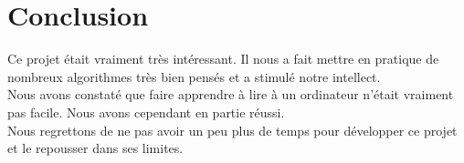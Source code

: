 \documentclass[12pt]{report}
\begin{document}
% 
% 










 


\chapter*{Conclusion}

Ce projet était vraiment très intéressant. Il nous a fait mettre en pratique de
nombreux algorithmes très bien pensés et a stimulé notre intellect. \\

Nous avons constaté que faire apprendre à lire à un ordinateur n'était vraiment
pas facile. Nous avons cependant en partie réussi. \\

Nous regrettons de ne pas avoir un peu plus de temps pour développer ce projet
et le repousser dans ses limites.
\end{document}
